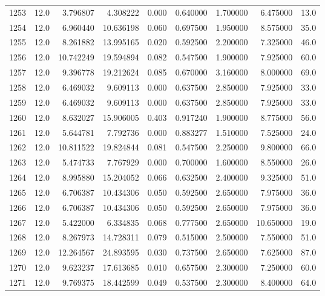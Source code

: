 \begin{tabular}{lrrrrrrrr}
1253 &   12.0 &   3.796807 &   4.308222 &  0.000 &  0.640000 &  1.700000 &   6.475000 &   13.0 \\
1254 &   12.0 &   6.960440 &  10.636198 &  0.060 &  0.697500 &  1.950000 &   8.575000 &   35.0 \\
1255 &   12.0 &   8.261882 &  13.995165 &  0.020 &  0.592500 &  2.200000 &   7.325000 &   46.0 \\
1256 &   12.0 &  10.742249 &  19.594894 &  0.082 &  0.547500 &  1.900000 &   7.925000 &   60.0 \\
1257 &   12.0 &   9.396778 &  19.212624 &  0.085 &  0.670000 &  3.160000 &   8.000000 &   69.0 \\
1258 &   12.0 &   6.469032 &   9.609113 &  0.000 &  0.637500 &  2.850000 &   7.925000 &   33.0 \\
1259 &   12.0 &   6.469032 &   9.609113 &  0.000 &  0.637500 &  2.850000 &   7.925000 &   33.0 \\
1260 &   12.0 &   8.632027 &  15.906005 &  0.403 &  0.917240 &  1.900000 &   8.775000 &   56.0 \\
1261 &   12.0 &   5.644781 &   7.792736 &  0.000 &  0.883277 &  1.510000 &   7.525000 &   24.0 \\
1262 &   12.0 &  10.811522 &  19.824844 &  0.081 &  0.547500 &  2.250000 &   9.800000 &   66.0 \\
1263 &   12.0 &   5.474733 &   7.767929 &  0.000 &  0.700000 &  1.600000 &   8.550000 &   26.0 \\
1264 &   12.0 &   8.995880 &  15.204052 &  0.066 &  0.632500 &  2.400000 &   9.325000 &   51.0 \\
1265 &   12.0 &   6.706387 &  10.434306 &  0.050 &  0.592500 &  2.650000 &   7.975000 &   36.0 \\
1266 &   12.0 &   6.706387 &  10.434306 &  0.050 &  0.592500 &  2.650000 &   7.975000 &   36.0 \\
1267 &   12.0 &   5.422000 &   6.334835 &  0.068 &  0.777500 &  2.650000 &  10.650000 &   19.0 \\
1268 &   12.0 &   8.267973 &  14.728311 &  0.079 &  0.515000 &  2.500000 &   7.550000 &   51.0 \\
1269 &   12.0 &  12.264567 &  24.893595 &  0.030 &  0.737500 &  2.650000 &   7.625000 &   87.0 \\
1270 &   12.0 &   9.623237 &  17.613685 &  0.010 &  0.657500 &  2.300000 &   7.250000 &   60.0 \\
1271 &   12.0 &   9.769375 &  18.442599 &  0.049 &  0.537500 &  2.300000 &   8.400000 &   64.0 \\

\end{tabular}
